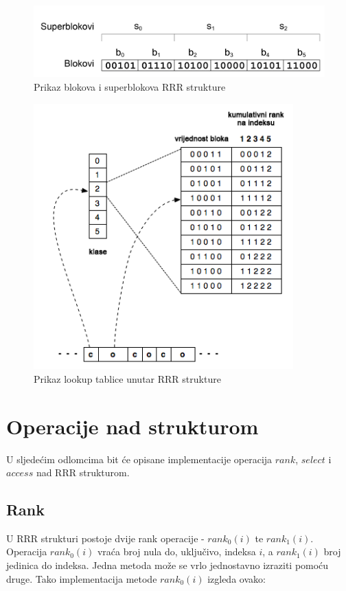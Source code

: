 \documentclass[times, utf8, seminar, numeric]{fer}
\begin{document}
\begin{figure}[ht]
	\centering
	\includegraphics[width=15cm]{img/rrr_blocks.png}
	\caption{Prikaz blokova i superblokova RRR strukture}
	\label{fig:rrr}
\end{figure}

\begin{figure}[ht]
	\centering
	\includegraphics[width=10cm]{img/rrr-binary-table.png}
	\caption{Prikaz lookup tablice unutar RRR strukture}
	\label{fig:lookup}
\end{figure}


\section{Operacije nad strukturom}
U sljedećim odlomcima bit će opisane implementacije operacija $rank$, $select$ i $access$ nad RRR strukturom.


\subsection{Rank}
\label{subsec:rank}
U RRR strukturi postoje dvije rank operacije - $rank_0(i)$ te $rank_1(i)$. Operacija $rank_0(i)$ vraća broj nula do, uključivo, indeksa $i$, a $rank_1(i)$ broj jedinica do indeksa. 
Jedna metoda može se vrlo jednostavno izraziti pomoću druge. Tako implementacija metode $rank_0(i)$ izgleda ovako:
\end{document}
